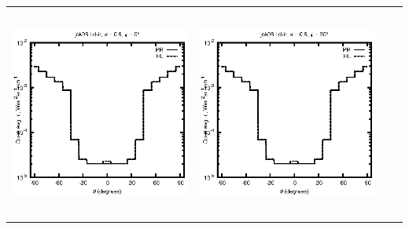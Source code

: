 \begin{tabular}{c c c c}
\includegraphics[height=7cm]{../eps/jok06_Ld_ir_fwd.eps} &
\includegraphics[height=7cm]{../eps/jok06_Ld_ir_cross.eps} \\
\end{tabular}

\pagebreak


